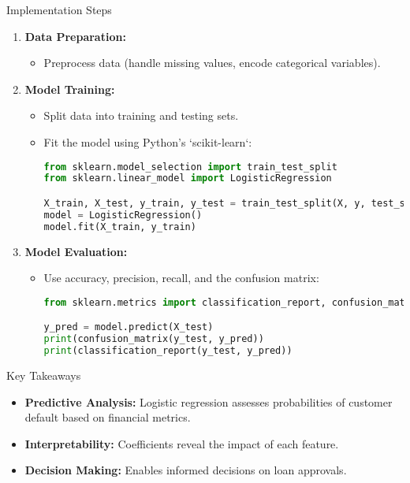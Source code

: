 \documentclass[aspectratio=169]{beamer}
\begin{document}
\begin{frame}[fragile]{Implementation Steps}
  \begin{enumerate}
    \item \textbf{Data Preparation:}
      \begin{itemize}
        \item Preprocess data (handle missing values, encode categorical variables).
      \end{itemize}

    \item \textbf{Model Training:}
      \begin{itemize}
        \item Split data into training and testing sets.
        \item Fit the model using Python's `scikit-learn`:
        \begin{lstlisting}[language=Python]
from sklearn.model_selection import train_test_split
from sklearn.linear_model import LogisticRegression

X_train, X_test, y_train, y_test = train_test_split(X, y, test_size=0.2, random_state=42)
model = LogisticRegression()
model.fit(X_train, y_train)
        \end{lstlisting}
      \end{itemize}

    \item \textbf{Model Evaluation:}
      \begin{itemize}
        \item Use accuracy, precision, recall, and the confusion matrix:
        \begin{lstlisting}[language=Python]
from sklearn.metrics import classification_report, confusion_matrix

y_pred = model.predict(X_test)
print(confusion_matrix(y_test, y_pred))
print(classification_report(y_test, y_pred))
        \end{lstlisting}
      \end{itemize}
  \end{enumerate}
\end{frame}

\begin{frame}[fragile]{Key Takeaways}
  \begin{itemize}
    \item \textbf{Predictive Analysis:} Logistic regression assesses probabilities of customer default based on financial metrics.
    \item \textbf{Interpretability:} Coefficients reveal the impact of each feature.
    \item \textbf{Decision Making:} Enables informed decisions on loan approvals.
  \end{itemize}
\end{frame}
\end{document}
